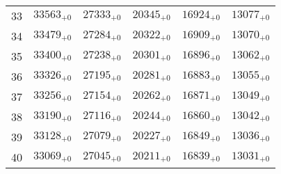 \documentclass[10pt, a4paper]{article}
\begin{document}
\begin{center}
\begin{tabular}{c || c c c c c}
        33 & \({33563}_{+0}\) & \({27333}_{+0}\) & \({20345}_{+0}\) & \({16924}_{+0}\) & \({13077}_{+0}\)\\
        34 & \({33479}_{+0}\) & \({27284}_{+0}\) & \({20322}_{+0}\) & \({16909}_{+0}\) & \({13070}_{+0}\)\\
        35 & \({33400}_{+0}\) & \({27238}_{+0}\) & \({20301}_{+0}\) & \({16896}_{+0}\) & \({13062}_{+0}\)\\
        \hline
        36 & \({33326}_{+0}\) & \({27195}_{+0}\) & \({20281}_{+0}\) & \({16883}_{+0}\) & \({13055}_{+0}\)\\
        37 & \({33256}_{+0}\) & \({27154}_{+0}\) & \({20262}_{+0}\) & \({16871}_{+0}\) & \({13049}_{+0}\)\\
        38 & \({33190}_{+0}\) & \({27116}_{+0}\) & \({20244}_{+0}\) & \({16860}_{+0}\) & \({13042}_{+0}\)\\
        39 & \({33128}_{+0}\) & \({27079}_{+0}\) & \({20227}_{+0}\) & \({16849}_{+0}\) & \({13036}_{+0}\)\\
        40 & \({33069}_{+0}\) & \({27045}_{+0}\) & \({20211}_{+0}\) & \({16839}_{+0}\) & \({13031}_{+0}\)\\
        \hline
    \end{tabular}
\end{center}
\pagebreak
\end{document}

